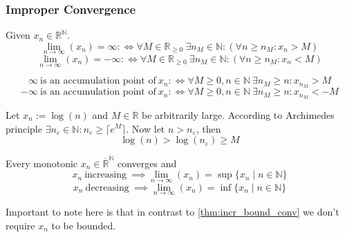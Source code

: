 \subsubsection{Improper Convergence}
\begin{definition}
   Given \(x_n \in \mathbb{R}^\mathbb{N}\).
   \[\lim_{n \to \infty}(x_n) = \infty :\iff \forall M \in \mathbb{R}_{\geq 0}~\exists n_M \in \mathbb{N}: (\forall n \geq n_M: x_n > M)\]
   \[\lim_{n \to \infty}(x_n) = -\infty :\iff \forall M \in \mathbb{R}_{\geq 0}~\exists n_M \in \mathbb{N}: (\forall n \geq n_M: x_n < M)\]
\end{definition}
\begin{remark}
   \[\infty~\text{is an accumulation point of}~x_n :\iff \forall M \geq 0, n \in \mathbb{N}~\exists n_M \geq n: x_{n_M} > M\]
   \[-\infty~\text{is an accumulation point of}~x_n :\iff \forall M \geq 0, n \in \mathbb{N}~\exists n_M \geq n: x_{n_M} < -M\]
\end{remark}
\begin{example}
   Let \(x_n := \log(n)\) and \(M \in \mathbb{R}\) be arbitrarily large.
   According to Archimedes principle \(\exists n_\varepsilon \in \mathbb{N}: n_\varepsilon \geq \lceil e^M\rceil\).
   Now let \(n > n_\varepsilon\), then
   \[\log(n) > \log(n_\varepsilon) \geq M\]
\end{example}

\begin{theorem}\label{thm:improper_limits}
   Every monotonic \(x_n \in \overline{\mathbb{R}}^\mathbb{N}\) converges and
   \[x_n~\text{increasing}~\implies \lim_{n \to \infty}(x_n) = \sup\{x_n \mid n \in \mathbb{N}\}\]
   \[x_n~\text{decreasing}~\implies \lim_{n \to \infty}(x_n) = \inf\{x_n \mid n \in \mathbb{N}\}\]
\end{theorem}
\begin{remark}
   Important to note here is that in contrast to \cref{thm:incr_bound_conv} we don't require \(x_n\) to be bounded.
\end{remark}

